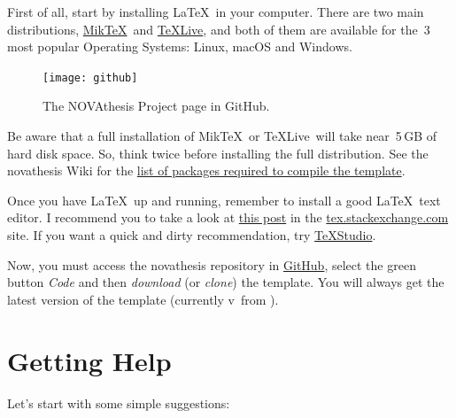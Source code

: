 \newcommand{\MikTeX}{Mik\TeX}
\newcommand{\TeXLive}{\TeX Live}

First of all, start by installing \LaTeX\ in your computer.  There are two main distributions, \href{https://miktex.org}{\MikTeX}\ and \href{https://www.tug.org/texlive/}{\TeXLive}, and both of them are available for the~3 most popular Operating Systems: Linux, macOS and Windows.

\begin{figure}
\texttt{[image: github]}%
\caption{The NOVAthesis Project page in GitHub.}
\end{figure}

Be aware that a full installation of \MikTeX\ or \TeXLive\ will take near~5\,GB of hard disk space.  So, think twice before installing the full distribution.  See the \gls{novathesis} Wiki for the \href{https://github.com/joaomlourenco/novathesis/wiki/installing-latex#minimal-installation-in-any-of-the-systems-above}{list of packages required to compile the template}.

Once you have \LaTeX\ up and running, remember to install a good \LaTeX\ text editor.  I recommend you to take a look at  \href{https://tex.stackexchange.com/questions/339/latex-editors-ides}{this post} in the \url{tex.stackexchange.com} site.  If you want a quick and dirty recommendation, try \href{https://www.texstudio.org/}{TeXStudio}.

Now, you must access the \gls{novathesis} repository in \href{https://github.com/joaomlourenco/novathesis}{GitHub}, select the green button \emph{Code} and then \emph{download} (or \emph{clone}) the template.  You will always get the latest version of the template (currently v\novathesisversion\ from \novathesisdate).


\section{Getting Help}
\label{sec:getting_help}
Let's start with some simple suggestions:


